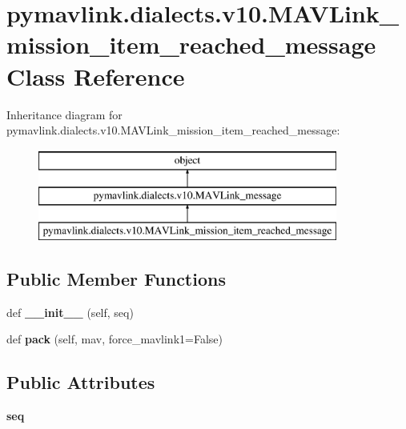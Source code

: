 \hypertarget{classpymavlink_1_1dialects_1_1v10_1_1MAVLink__mission__item__reached__message}{}\section{pymavlink.\+dialects.\+v10.\+M\+A\+V\+Link\+\_\+mission\+\_\+item\+\_\+reached\+\_\+message Class Reference}
\label{classpymavlink_1_1dialects_1_1v10_1_1MAVLink__mission__item__reached__message}
Inheritance diagram for pymavlink.\+dialects.\+v10.\+M\+A\+V\+Link\+\_\+mission\+\_\+item\+\_\+reached\+\_\+message\+:\begin{figure}[H]
\begin{center}
\leavevmode
\includegraphics[height=3.000000cm]{classpymavlink_1_1dialects_1_1v10_1_1MAVLink__mission__item__reached__message}
\end{center}
\end{figure}
\subsection*{Public Member Functions}
\begin{DoxyCompactItemize}
\item 
\mbox{\label{classpymavlink_1_1dialects_1_1v10_1_1MAVLink__mission__item__reached__message_a452820b6b76910dc8a2ab5fd2a4bf666}} 
def {\bfseries \+\_\+\+\_\+init\+\_\+\+\_\+} (self, seq)
\item 
\mbox{\label{classpymavlink_1_1dialects_1_1v10_1_1MAVLink__mission__item__reached__message_aa71107a068ea3eadd4a3e440da2e5735}} 
def {\bfseries pack} (self, mav, force\+\_\+mavlink1=False)
\end{DoxyCompactItemize}
\subsection*{Public Attributes}
\begin{DoxyCompactItemize}
\item 
\mbox{\label{classpymavlink_1_1dialects_1_1v10_1_1MAVLink__mission__item__reached__message_af3268114d2c059b171b4e863e428ab8c}} 
{\bfseries seq}
\end{DoxyCompactItemize}
